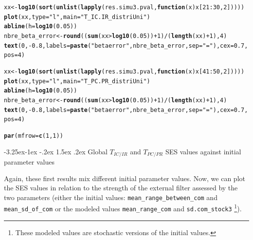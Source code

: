 \documentclass[12pt]{article}\usepackage[]{graphicx}\usepackage[]{color}
\makeatletter
\newcommand{\hlnum}[1]{\textcolor[rgb]{0.686,0.059,0.569}{#1}}%
\newcommand{\hlstr}[1]{\textcolor[rgb]{0.192,0.494,0.8}{#1}}%
\newcommand{\hlopt}[1]{\textcolor[rgb]{0,0,0}{#1}}%
\newcommand{\hlstd}[1]{\textcolor[rgb]{0.345,0.345,0.345}{#1}}%
\newcommand{\hlkwa}[1]{\textcolor[rgb]{0.161,0.373,0.58}{\textbf{#1}}}%
\newcommand{\hlkwb}[1]{\textcolor[rgb]{0.69,0.353,0.396}{#1}}%
\newcommand{\hlkwc}[1]{\textcolor[rgb]{0.333,0.667,0.333}{#1}}%
\newcommand{\hlkwd}[1]{\textcolor[rgb]{0.737,0.353,0.396}{\textbf{#1}}}%
\newenvironment{kframe}{%
 \def\at@end@of@kframe{}%
 \ifinner\ifhmode%
  \def\at@end@of@kframe{\end{minipage}}%
  \begin{minipage}{\columnwidth}%
 \fi\fi%
 \def\FrameCommand##1{\hskip\@totalleftmargin \hskip-\fboxsep
 \colorbox{shadecolor}{##1}\hskip-\fboxsep
     \hskip-\linewidth \hskip-\@totalleftmargin \hskip\columnwidth}%
 \MakeFramed {\advance\hsize-\width
   \@totalleftmargin\z@ \linewidth\hsize
   \@setminipage}}%
 {\par\unskip\endMakeFramed%
 \at@end@of@kframe}
\newenvironment{knitrout}{}{} %
\newcounter {subsubsubsection}[subsubsection]
\newcommand\subsubsubsection{\@startsection{subsubsubsection}{4}{\z@}%
          {-3.25ex\@plus -1ex \@minus -.2ex}%
          {1.5ex \@plus .2ex}%
          {\normalfont\normalsize\bfseries}}
\makeatother
\begin{document}
\begin{knitrout}
\begin{kframe}
\begin{alltt}
\hlstd{xx} \hlkwb{<-} \hlkwd{log10}\hlstd{(}\hlkwd{sort}\hlstd{(}\hlkwd{unlist}\hlstd{(}\hlkwd{lapply}\hlstd{(res.simu3.pval,} \hlkwa{function}\hlstd{(}\hlkwc{x}\hlstd{) x[}\hlnum{21}\hlopt{:}\hlnum{30}\hlstd{,} \hlnum{2}\hlstd{]))))}
\hlkwd{plot}\hlstd{(xx,} \hlkwc{type} \hlstd{=} \hlstr{"l"}\hlstd{,} \hlkwc{main} \hlstd{=} \hlstr{"T_IC.IR_distriUni"}\hlstd{)}
\hlkwd{abline}\hlstd{(}\hlkwc{h} \hlstd{=} \hlkwd{log10}\hlstd{(}\hlnum{0.05}\hlstd{))}
\hlstd{nbre_beta_error} \hlkwb{<-} \hlkwd{round}\hlstd{((}\hlkwd{sum}\hlstd{(xx}\hlopt{>}\hlkwd{log10}\hlstd{(}\hlnum{0.05}\hlstd{))}\hlopt{+}\hlnum{1}\hlstd{)}\hlopt{/}\hlstd{(}\hlkwd{length}\hlstd{(xx)}\hlopt{+}\hlnum{1}\hlstd{),} \hlnum{4}\hlstd{)}
\hlkwd{text}\hlstd{(}\hlnum{0}\hlstd{,} \hlopt{-}\hlnum{0.8}\hlstd{,} \hlkwc{labels} \hlstd{=} \hlkwd{paste}\hlstd{(}\hlstr{"beta error"}\hlstd{, nbre_beta_error,} \hlkwc{sep} \hlstd{=} \hlstr{" = "}\hlstd{),} \hlkwc{cex} \hlstd{=} \hlnum{0.7}\hlstd{,} \hlkwc{pos} \hlstd{=} \hlnum{4}\hlstd{)}

\hlstd{xx} \hlkwb{<-} \hlkwd{log10}\hlstd{(}\hlkwd{sort}\hlstd{(}\hlkwd{unlist}\hlstd{(}\hlkwd{lapply}\hlstd{(res.simu3.pval,} \hlkwa{function}\hlstd{(}\hlkwc{x}\hlstd{) x[}\hlnum{41}\hlopt{:}\hlnum{50}\hlstd{,} \hlnum{2}\hlstd{]))))}
\hlkwd{plot}\hlstd{(xx,} \hlkwc{type} \hlstd{=} \hlstr{"l"}\hlstd{,} \hlkwc{main} \hlstd{=} \hlstr{"T_PC.PR_distriUni"}\hlstd{)}
\hlkwd{abline}\hlstd{(}\hlkwc{h} \hlstd{=} \hlkwd{log10}\hlstd{(}\hlnum{0.05}\hlstd{))}
\hlstd{nbre_beta_error} \hlkwb{<-} \hlkwd{round}\hlstd{((}\hlkwd{sum}\hlstd{(xx}\hlopt{>}\hlkwd{log10}\hlstd{(}\hlnum{0.05}\hlstd{))}\hlopt{+}\hlnum{1}\hlstd{)}\hlopt{/}\hlstd{(}\hlkwd{length}\hlstd{(xx)}\hlopt{+}\hlnum{1}\hlstd{),} \hlnum{4}\hlstd{)}
\hlkwd{text}\hlstd{(}\hlnum{0}\hlstd{,} \hlopt{-}\hlnum{0.8}\hlstd{,} \hlkwc{labels} \hlstd{=} \hlkwd{paste}\hlstd{(}\hlstr{"beta error"}\hlstd{, nbre_beta_error,} \hlkwc{sep} \hlstd{=} \hlstr{" = "}\hlstd{),} \hlkwc{cex} \hlstd{=} \hlnum{0.7}\hlstd{,} \hlkwc{pos} \hlstd{=} \hlnum{4}\hlstd{)}

\hlkwd{par}\hlstd{(}\hlkwc{mfrow} \hlstd{=} \hlkwd{c}\hlstd{(}\hlnum{1}\hlstd{,} \hlnum{1}\hlstd{))}
\end{alltt}
\end{kframe}
\end{knitrout}


  \subsubsubsection {Global $T_{IC/IR}$ and $T_{PC/PR}$ SES values against initial parameter values}
  
Again, these first results mix different initial parameter values. Now, we can plot the SES values in relation to the strength of the external filter assessed by the two parameters (either the initial values: \texttt{mean\_range\_between\_com} and \texttt{mean\_sd\_of\_com} or the modeled values \texttt{mean\_{}range\_{}com} and \texttt{sd.com\_{}stock3} \footnote{These modeled values are stochastic versions of the initial values.}). 
\end{document}
